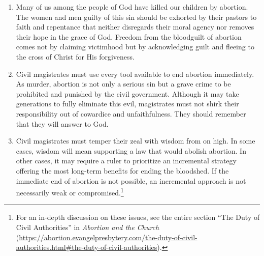 \documentclass[
]{book}
\begin{document}
\begin{enumerate}
\def\labelenumi{\arabic{enumi}.}
\setcounter{enumi}{12}
\item
  Many of us among the people of God have killed our children by abortion. The women and men guilty of this sin should be exhorted by their pastors to faith and repentance that neither disregards their moral agency nor removes their hope in the grace of God. Freedom from the bloodguilt of abortion comes not by claiming victimhood but by acknowledging guilt and fleeing to the cross of Christ for His forgiveness.
\item
  Civil magistrates must use every tool available to end abortion immediately. As murder, abortion is not only a serious sin but a grave crime to be prohibited and punished by the civil government. Although it may take generations to fully eliminate this evil, magistrates must not shirk their responsibility out of cowardice and unfaithfulness. They should remember that they will answer to God.
\item
  Civil magistrates must temper their zeal with wisdom from on high. In some cases, wisdom will mean supporting a law that would abolish abortion. In other cases, it may require a ruler to prioritize an incremental strategy offering the most long-term benefits for ending the bloodshed. If the immediate end of abortion is not possible, an incremental approach is not necessarily weak or compromised.\footnote{For an in-depth discussion on these issues, see the entire section ``The Duty of Civil Authorities'' in \emph{Abortion and the Church} (\url{https://abortion.evangelpresbytery.com/the-duty-of-civil-authorities.html\#the-duty-of-civil-authorities}).}
\end{enumerate}
\end{document}
